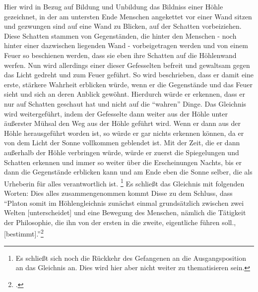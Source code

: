 Hier wird in Bezug auf Bildung und Unbildung das Bildniss einer Höhle gezeichnet, in der am untersten Ende Menschen angekettet vor einer Wand sitzen und gezwungen sind auf eine Wand zu Blicken, auf der Schatten vorbeiziehen. Diese Schatten stammen von Gegenständen, die hinter den Menschen - noch hinter einer dazwischen liegenden Wand - vorbeigetragen werden und von einem Feuer so beschienen werden, dass sie eben ihre Schatten auf die Höhlenwand werfen. Nun wird allerdings einer dieser Gefesselten befreit und gewaltsam gegen das Licht gedreht und zum Feuer geführt. So wird beschrieben, dass er damit eine erste, stärkere Wahrheit erblicken würde, wenn er die Gegenstände und das Feuer sieht und sich an deren Anblick gewöhnt. Hierdurch würde er erkennen, dass er nur auf Schatten geschaut hat und nicht auf die \enquote{wahren} Dinge. Das Gleichnis wird weitergeführt, indem der Gefesselte dann weiter aus der Höhle unter äußerster Mühsal den Weg aus der Höhle geführt wird. Wenn er dann aus der Höhle herausgeführt worden ist, so würde er gar nichts erkennen können, da er von dem Licht der Sonne vollkommen geblendet ist. Mit der Zeit, die er dann außerhalb der Höhle verbringen würde, würde er zuerst die Spiegelungen und Schatten erkennen und immer so weiter über die Erscheinungen Nachts, bis er dann die Gegenstände erblicken kann und am Ende eben die Sonne selber, die als Urheberin für alles verantwortlich ist. \footnote{Es schließt sich noch die Rückkehr des Gefangenen an die Ausgangsposition an das Gleichnis an. Dies wird hier aber nicht weiter zu thematisieren sein.} Es schließt das Gleichnis mit folgenden Worten:
Dies alles zusammengenommen kommt Disse zu dem Schluss, dass \enquote{Platon somit im Höhlengleichnis zunächst einmal grundsätzlich zwischen zwei Welten [unterscheidet] und eine Bewegung des Menschen, nämlich die Tätigkeit der Philosophie, die ihn von der ersten in die zweite, eigentliche führen soll., [bestimmt].}\footcite[vgl.][S. 23f.]{DisseMetaphysik}
